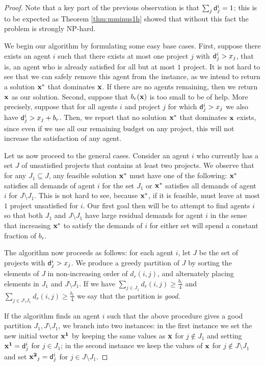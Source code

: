\documentclass{article}
\begin{document}
\begin{proof}
Note that a key part of the previous observation is that $\sum_j {\sf d}^i_j=1$;
this is to be expected as Theorem \ref{thm:mminus1h} showed that without this
fact the problem is strongly NP-hard.

We begin our algorithm by formulating some easy base cases. First, suppose
there exists an agent $i$ such that there exists at most one project $j$ with
${\sf d}^i_j>x_j$, that is, an agent who is already satisfied for all but at most
$1$ project. It is not hard to see that we can safely remove this agent from
the instance, as we intend to return a solution ${\bf x^*}$ that dominates $\bf
x$. If there are no agents remaining, then we return $\bf x$ as our solution. 
Second, suppose that $b_r({\bf x})$ is too small to be of help. More precisely,
suppose that for all agents $i$ and project $j$ for which ${\sf d}^i_j>x_j$ we
also have ${\sf d}^i_j>x_j+b_r$. Then, we report that no solution ${\bf x}^*$ that dominates ${\bf x}$ exists, since
even if we use all our remaining budget on any project, this will not increase
the satisfaction of any agent.

Let us now proceed to the general cases. Consider an agent $i$ who currently
has a set $J$ of unsatisfied projects that contains at least two projects. We
observe that for any $J_1\subseteq J$, any feasible solution $\bf x^*$ must
have one of the following: $\bf x^*$ satisfies all demands of agent $i$ for the
set $J_1$ or $\bf x^*$ satisfies all demands of agent $i$ for $J\setminus J_1$.
This is not hard to see, because $\bf x^*$, if it is feasible, must leave at
most $1$ project unsatisfied for $i$. Our first goal then will be to attempt to
find agents $i$ so that both $J_1$ and $J\setminus J_1$ have large residual
demands for agent $i$ in the sense that increasing $\bf x^*$ to satisfy the
demands of $i$ for either set will spend a constant fraction of $b_r$.

The algorithm now proceeds as follows: for each agent $i$, let $J$ be the set
of projects with ${\sf d}^i_j>x_j$. We produce a greedy partition of $J$ by
sorting the elements of $J$ in non-increasing order of $d_r(i,j)$, and
alternately placing elements in $J_1$ and $J\setminus J_1$. If we have
$\sum_{j\in J_1} d_r(i,j) \ge \frac{b_r}{4}$ and $\sum_{j\in J\setminus J_1}
d_r(i,j) \ge \frac{b_r}{4}$ we say that the partition is \emph{good}.

If the algorithm finds an agent $i$ such that the above procedure gives a good
partition $J_1, J\setminus J_1$, we branch into two instances: in the first
instance we set the new initial vector ${\bf x^1}$ by keeping the same values
as $\bf x$ for $j\not\in J_1$ and setting ${\bf x^1}={\sf d}^i_j$ for $j\in J_1$;
in the second instance we keep the values of $\bf x$ for $j\not\in J\setminus
J_1$ and set ${\bf x^2}_j = {\sf d}^i_j$ for $j\in J\setminus J_1$. 


\end{proof}
\end{document}
